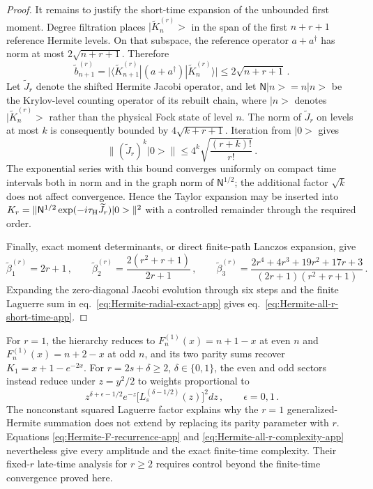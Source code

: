 \documentclass[a4paper,11pt]{article}
\def\ket#1{|#1>}%
\def\dd{d}%
\def\ii{i}%
\def\ee{e}%
\def\Jac{J}%
\theoremstyle{definition}
\theoremstyle{remark}
\newcommand{\ket}[1]{|#1\rangle}
\newcommand{\dd}{\mathrm d}
\newcommand{\ii}{\mathrm i}
\newcommand{\ee}{\mathrm e}
\newcommand{\Jac}{\mathsf J}
\begin{document}
\begin{proof}
It remains to justify the short-time expansion of the unbounded first moment.  Degree filtration
places $\ket{\widetilde K_n^{(r)}}$ in the span of the first $n+r+1$ reference Hermite levels.
On that subspace, the reference operator $a+a^\dagger$ has norm at most
$2\sqrt{n+r+1}$.  Therefore
\begin{equation}
   \widetilde b_{n+1}^{(r)}
   =\bigl|\langle\widetilde K_{n+1}^{(r)}|
      (a+a^\dagger)|\widetilde K_n^{(r)}\rangle\bigr|
   \le2\sqrt{n+r+1}\,.
   \label{eq:Hermite-shifted-hopping-bound-app}
\end{equation}
Let $\widetilde\Jac_r$ denote the shifted Hermite Jacobi operator, and let
$\mathsf N\ket n=n\ket n$ be the Krylov-level counting operator of its rebuilt chain, where
$\ket n$ denotes $\ket{\widetilde K_n^{(r)}}$ rather than the physical Fock state of level $n$.
The norm of $\widetilde\Jac_r$ on levels at
most $k$ is consequently bounded by $4\sqrt{k+r+1}$.  Iteration from $\ket0$ gives
\begin{equation}
   \|(\widetilde\Jac_r)^k\ket0\|
   \le4^k\sqrt{\frac{(r+k)!}{r!}}\,.
   \label{eq:Hermite-analytic-vector-bound-app}
\end{equation}
The exponential series with this bound converges uniformly on compact time intervals both in
norm and in the graph norm of $\mathsf N^{1/2}$; the additional factor $\sqrt{k}$ does not affect
convergence.  Hence the Taylor expansion may be inserted into
$K_r=\|\mathsf N^{1/2}\exp(-\ii\tau_{\rm H}\widetilde\Jac_r)\ket0\|^2$ with a controlled
remainder through the required order.

Finally, exact moment determinants, or direct finite-path Lanczos expansion, give
\begin{equation}
   \widetilde\beta_1^{(r)}=2r+1\,,
   \qquad
   \widetilde\beta_2^{(r)}=\frac{2(r^2+r+1)}{2r+1}\,,
   \qquad
   \widetilde\beta_3^{(r)}=
   \frac{2r^4+4r^3+19r^2+17r+3}
        {(2r+1)(r^2+r+1)}\,.
   \label{eq:Hermite-first-three-beta-app}
\end{equation}
Expanding the zero-diagonal Jacobi evolution through six steps and the finite Laguerre sum in
eq.~\eqref{eq:Hermite-radial-exact-app} gives
eq.~\eqref{eq:Hermite-all-r-short-time-app}.
\end{proof}

For $r=1$, the hierarchy reduces to
$F_n^{(1)}(x)=n+1-x$ at even $n$ and $F_n^{(1)}(x)=n+2-x$ at odd $n$, and its two parity sums
recover $K_1=x+1-\ee^{-2x}$.  For $r=2s+\delta\ge2$, $\delta\in\{0,1\}$, the even and odd sectors
instead reduce under $z=y^2/2$ to weights proportional to
\begin{equation}
   z^{\delta+\epsilon-1/2}\ee^{-z}
   \bigl[L_s^{(\delta-1/2)}(z)\bigr]^2\dd z\,,
   \qquad \epsilon=0,1\,.
   \label{eq:Hermite-parity-weights-app}
\end{equation}
The nonconstant squared Laguerre factor explains why the $r=1$ generalized-Hermite summation does
not extend by replacing its parity parameter with $r$.  Equations
\eqref{eq:Hermite-F-recurrence-app} and \eqref{eq:Hermite-all-r-complexity-app} nevertheless give
every amplitude and the exact finite-time complexity.  Their fixed-$r$ late-time analysis for
$r\ge2$ requires control beyond the finite-time convergence proved here.
\end{document}
